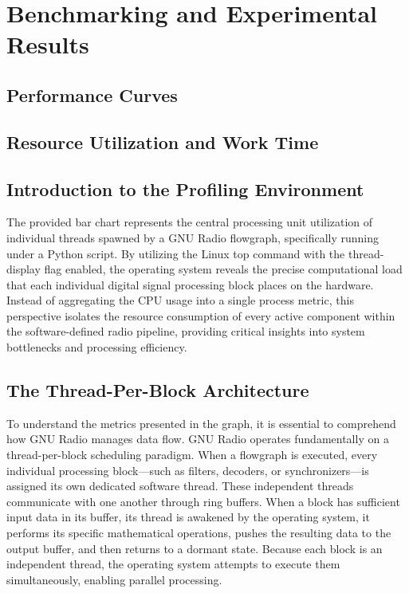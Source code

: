 
\chapter{Benchmarking and Experimental Results } \label{ch:Benchmarking}


\section{Performance Curves}

\section{Resource Utilization and Work Time}





\section{Introduction to the Profiling Environment}

The provided bar chart represents the central processing unit utilization of individual threads spawned by a GNU Radio flowgraph, specifically running under a Python script. By utilizing the Linux top command with the thread-display flag enabled, the operating system reveals the precise computational load that each individual digital signal processing block places on the hardware. Instead of aggregating the CPU usage into a single process metric, this perspective isolates the resource consumption of every active component within the software-defined radio pipeline, providing critical insights into system bottlenecks and processing efficiency.

\section{The Thread-Per-Block Architecture}

To understand the metrics presented in the graph, it is essential to comprehend how GNU Radio manages data flow. GNU Radio operates fundamentally on a thread-per-block scheduling paradigm. When a flowgraph is executed, every individual processing block—such as filters, decoders, or synchronizers—is assigned its own dedicated software thread. These independent threads communicate with one another through ring buffers. When a block has sufficient input data in its buffer, its thread is awakened by the operating system, it performs its specific mathematical operations, pushes the resulting data to the output buffer, and then returns to a dormant state. Because each block is an independent thread, the operating system attempts to execute them simultaneously, enabling parallel processing.


